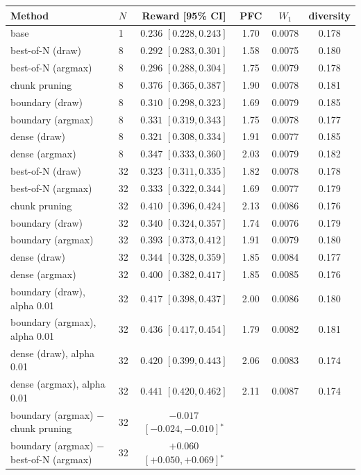 \begin{tabular}{llcccc}
\toprule
Method & $N$ & Reward [95\% CI] & PFC & $W_1$ & diversity \\
\midrule
base & 1 & $0.236$ $[0.228, 0.243]$ & 1.70 & 0.0078 & 0.178 \\
best-of-N (draw) & 8 & $0.292$ $[0.283, 0.301]$ & 1.58 & 0.0075 & 0.180 \\
best-of-N (argmax) & 8 & $0.296$ $[0.288, 0.304]$ & 1.75 & 0.0079 & 0.178 \\
chunk pruning & 8 & $0.376$ $[0.365, 0.387]$ & 1.90 & 0.0078 & 0.181 \\
boundary (draw) & 8 & $0.310$ $[0.298, 0.323]$ & 1.69 & 0.0079 & 0.185 \\
boundary (argmax) & 8 & $0.331$ $[0.319, 0.343]$ & 1.75 & 0.0078 & 0.177 \\
dense (draw) & 8 & $0.321$ $[0.308, 0.334]$ & 1.91 & 0.0077 & 0.185 \\
dense (argmax) & 8 & $0.347$ $[0.333, 0.360]$ & 2.03 & 0.0079 & 0.182 \\
best-of-N (draw) & 32 & $0.323$ $[0.311, 0.335]$ & 1.82 & 0.0078 & 0.178 \\
best-of-N (argmax) & 32 & $0.333$ $[0.322, 0.344]$ & 1.69 & 0.0077 & 0.179 \\
chunk pruning & 32 & $0.410$ $[0.396, 0.424]$ & 2.13 & 0.0086 & 0.176 \\
boundary (draw) & 32 & $0.340$ $[0.324, 0.357]$ & 1.74 & 0.0076 & 0.179 \\
boundary (argmax) & 32 & $0.393$ $[0.373, 0.412]$ & 1.91 & 0.0079 & 0.180 \\
dense (draw) & 32 & $0.344$ $[0.328, 0.359]$ & 1.85 & 0.0084 & 0.177 \\
dense (argmax) & 32 & $0.400$ $[0.382, 0.417]$ & 1.85 & 0.0085 & 0.176 \\
boundary (draw), alpha 0.01 & 32 & $0.417$ $[0.398, 0.437]$ & 2.00 & 0.0086 & 0.180 \\
boundary (argmax), alpha 0.01 & 32 & $0.436$ $[0.417, 0.454]$ & 1.79 & 0.0082 & 0.181 \\
dense (draw), alpha 0.01 & 32 & $0.420$ $[0.399, 0.443]$ & 2.06 & 0.0083 & 0.174 \\
dense (argmax), alpha 0.01 & 32 & $0.441$ $[0.420, 0.462]$ & 2.11 & 0.0087 & 0.174 \\
\midrule
boundary (argmax) $-$ chunk pruning & 32 & $-0.017$ $[-0.024, -0.010]$$^*$ & & & \\
boundary (argmax) $-$ best-of-N (argmax) & 32 & $+0.060$ $[+0.050, +0.069]$$^*$ & & & \\

\end{tabular}
